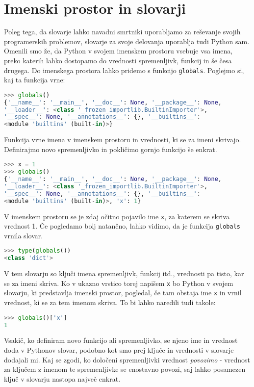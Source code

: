 \section{Imenski prostor in slovarji}
Poleg tega, da slovarje lahko navadni smrtniki uporabljamo za reševanje svojih programerskih problemov, slovarje za svoje delovanja uporablja tudi Python sam. Omenili smo že, da Python v svojem imenskem prostoru vsebuje vsa imena, preko katerih lahko dostopamo do vrednosti spremenljivk, funkcij in še česa drugega. Do imenskega prostora lahko pridemo s funkcijo \texttt{globals}. Poglejmo si, kaj ta funkcija vrne:
\begin{lstlisting}[language=Python]
>>> globals()
{'__name__': '__main__', '__doc__': None, '__package__': None, 
'__loader__': <class '_frozen_importlib.BuiltinImporter'>, 
'__spec__': None, '__annotations__': {}, '__builtins__':
<module 'builtins' (built-in)>}
\end{lstlisting}
Funkcija vrne imena v imenskem prostoru in vrednosti, ki se za imeni skrivajo. Definirajmo novo spremenljivko in pokličimo gornjo funkcijo še enkrat.
\begin{lstlisting}[language=Python]
>>> x = 1
>>> globals()
{'__name__': '__main__', '__doc__': None, '__package__': None, 
'__loader__': <class '_frozen_importlib.BuiltinImporter'>, 
'__spec__': None, '__annotations__': {}, '__builtins__':
<module 'builtins' (built-in)>, 'x': 1}
\end{lstlisting}
V imenskem prostoru se je zdaj očitno pojavilo ime \texttt{x}, za katerem se skriva vrednost 1. Če pogledamo bolj natančno, lahko vidimo, da je funkcija \texttt{globals} vrnila slovar.
\begin{lstlisting}[language=Python]
>>> type(globals())
<class 'dict'>
\end{lstlisting}
V tem slovarju so ključi imena spremenljivk, funkcij itd., vrednosti pa tisto, kar se za imeni skriva. Ko v ukazno vrstico torej napišem \texttt{x} bo Python v svojem slovarju, ki predstavlja imenski prostor, pogledal, če tam obstaja ime \texttt{x} in vrnil vrednost, ki se za tem imenom skriva. To bi lahko naredili tudi takole:
\begin{lstlisting}[language=Python]
>>> globals()['x']
1
\end{lstlisting}
Vsakič, ko definiram novo funkcijo ali spremenljivko, se njeno ime in vrednost doda v Pythonov slovar, podobno kot smo prej ključe in vrednosti v slovarje dodajali mi. Kaj se zgodi, ko določeni spremenljivki vrednost \emph{povozimo} - vrednost za ključem z imenom te spremenljivke se enostavno povozi, saj lahko posamezen ključ v slovarju nastopa največ enkrat.
